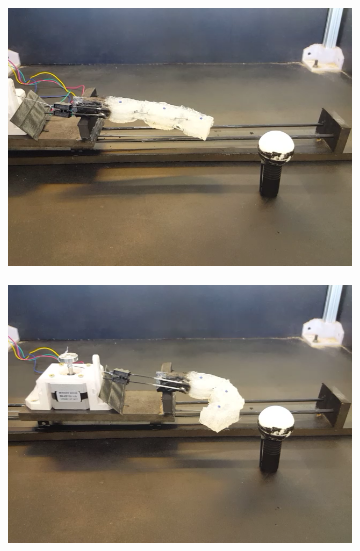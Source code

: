\documentclass[letterpaper, 10 pt, conference]{ieeeconf}  %
\begin{document}
 \begin{figure}[thpb]
        \centering
        \begin{subfigure}[b]{0.72in} 
                \centering
                \includegraphics[width=\textwidth]{figures/finger/finger1.png}
        \end{subfigure}
        \begin{subfigure}[b]{0.72in}                            
                \centering
                \includegraphics[width=\textwidth]{figures/finger/finger2.png}
        \end{subfigure}
        \begin{subfigure}[b]{0.72in} 
                \centering

\end{subfigure}
\end{figure}
\end{document}
